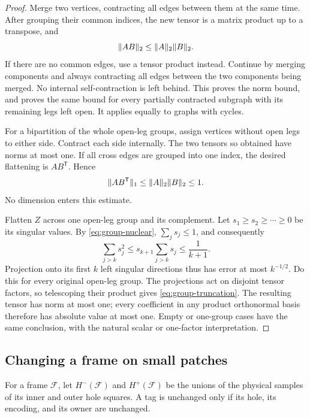 \begin{proof}
Merge two vertices, contracting all edges between them at the same time.
After grouping their common indices, the new tensor is a matrix product
up to a transpose, and
\[
  \lVert AB\rVert_2\le\lVert A\rVert_2\lVert B\rVert_2.
\]
If there are no common edges, use a tensor product instead.  Continue by
merging components and always contracting all edges between the two
components being merged.  No internal self-contraction is left behind.
This proves the norm bound, and proves the same bound for every partially
contracted subgraph with its remaining legs left open.  It applies equally
to graphs with cycles.

For a bipartition of the whole open-leg groups, assign vertices without
open legs to either side.  Contract each side internally.  The two tensors
so obtained have norms at most one.  If all cross edges are grouped into
one index, the desired flattening is $AB^{\mathsf T}$.  Hence
\begin{equation}\label{eq:group-nuclear}
  \lVert AB^{\mathsf T}\rVert_1\le\lVert A\rVert_2\lVert B\rVert_2\le1.
\end{equation}
No dimension enters this estimate.

Flatten $Z$ across one open-leg group and its complement.  Let
$s_1\ge s_2\ge\cdots\ge0$ be its singular values.  By
\eqref{eq:group-nuclear}, $\sum_js_j\le1$, and consequently
\[
 \sum_{j>k}s_j^2
     \le s_{k+1}\sum_{j>k}s_j\le\frac{1}{k+1}.
\]
Projection onto its first $k$ left singular directions thus has error at
most $k^{-1/2}$.  Do this for every original open-leg group.  The projections
act on disjoint tensor factors, so telescoping their product gives
\eqref{eq:group-truncation}.  The resulting tensor has norm at most one;
every coefficient in any product orthonormal basis therefore has absolute
value at most one.  Empty or one-group cases have the same conclusion,
with the natural scalar or one-factor interpretation.
\end{proof}

\subsection{Changing a frame on small patches}

For a frame $\mathcal F$, let $H^-(\mathcal F)$ and $H^+(\mathcal F)$ be the
unions of the physical samples of its inner and outer hole squares.  A tag
is unchanged only if its hole, its encoding, and its owner are unchanged.

